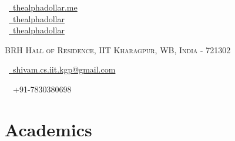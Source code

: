 \documentclass[a4paper,10pt]{extarticle} %
\begin{document}
\pagestyle{empty} %


\begin{multicols}{3}
\normalsize  \faGlobe\ {\href{https://thealphadollar.github.io/}{\  thealphadollar.me}}\\
\normalsize \faGithub\ {\href{https://github.com/thealphadollar}{\  thealphadollar}}\\
\normalsize  \faLinkedinSquare\ {\href{https://www.linkedin.com/in/thealphadollar}{\  thealphadollar}}\\
\columnbreak
\normalsize\par{\centering{\huge\textsc{\textcolor{primary}{Shivam Kumar Jha}}}\par} %
\par{\centering\normalsize {\textsc{BRH Hall of Residence, IIT Kharagpur, WB, India - 721302}}\hfill\par}
\columnbreak
\raggedright\hfill\normalsize \faEnvelope\ {\href{mailto:shivam.cs.iit.kgp@gmail.com}{\  shivam.cs.iit.kgp@gmail.com}}\\
\raggedright\hfill{\faPhone\ \  +91-7830380698}
\end{multicols}


\vspace{-0.6cm}
\section{\textcolor{primary}{Academics}}
\end{document}
